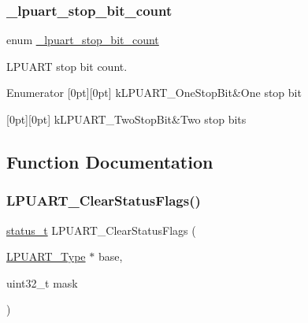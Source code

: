 \subsubsection{\texorpdfstring{\_lpuart\_stop\_bit\_count}{\_lpuart\_stop\_bit\_count}}
{\footnotesize\ttfamily enum \mbox{\hyperlink{group__lpuart__driver_gad19fe7bcda436707337f6d529d5da155}{\+\_\+lpuart\+\_\+stop\+\_\+bit\+\_\+count}}}



L\+P\+U\+A\+RT stop bit count. 

\begin{DoxyEnumFields}{Enumerator}
[0pt][0pt]{}\mbox{\label{group__lpuart__driver_ggad19fe7bcda436707337f6d529d5da155a4304f0ee73a5fabfadfc05ca1fbd3901}} 
k\+L\+P\+U\+A\+R\+T\+\_\+\+One\+Stop\+Bit&One stop bit \\
\hline

[0pt][0pt]{}\mbox{\label{group__lpuart__driver_ggad19fe7bcda436707337f6d529d5da155a6e049e0faaf89ed2dfe493ad8f6c93d4}} 
k\+L\+P\+U\+A\+R\+T\+\_\+\+Two\+Stop\+Bit&Two stop bits \\
\hline

\end{DoxyEnumFields}


\subsection{Function Documentation}
\mbox{\label{group__lpuart__driver_gac6bcdb29d31a2addb8d80d98855ba147}} 
\subsubsection{\texorpdfstring{LPUART\_ClearStatusFlags()}{LPUART\_ClearStatusFlags()}}
{\footnotesize\ttfamily \mbox{\hyperlink{group__ksdk__common_gaaabdaf7ee58ca7269bd4bf24efcde092}{status\+\_\+t}} L\+P\+U\+A\+R\+T\+\_\+\+Clear\+Status\+Flags (\begin{DoxyParamCaption}\item[{\mbox{\hyperlink{struct_l_p_u_a_r_t___type}{L\+P\+U\+A\+R\+T\+\_\+\+Type}} $\ast$}]{base,  }\item[{uint32\+\_\+t}]{mask }\end{DoxyParamCaption})}



